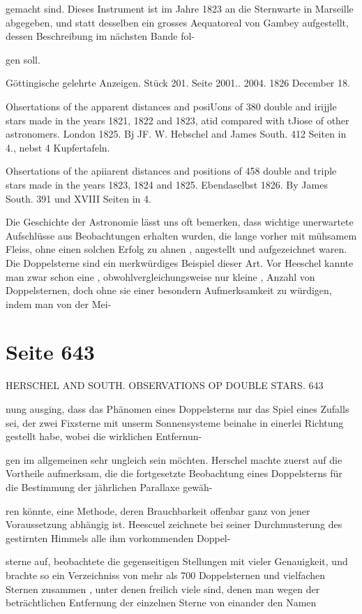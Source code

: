 \documentclass[10pt,a4paper]{article}
\begin{document}
gemacht sind. Dieses Instrument ist im Jahre 1823 an die Sternwarte in Marseille abgegeben, und statt desselben ein grosses Aequatoreal von Gambey aufgestellt, dessen Beschreibung im nächsten Bande fol-

gen soll.

Göttingische gelehrte Anzeigen. Stück 201. Seite 2001.. 2004. 1826 December 18.

Ohsertations of the apparent distances and posiUons of 380 double and irijjle stars made in the years 1821, 1822 and 1823, atid compared with tJiose of other astronomers. London 1825. Bj JF. W. Hebschel and James South. 412 Seiten in 4., nebst 4 Kupfertafeln.

Ohsertations of the apiiarent distances and positions of 458 double and triple stars made in the years 1823, 1824 and 1825. Ebendaselbst 1826. By James South. 391 und XVIII Seiten in 4.

Die Geschichte der Astronomie lässt uns oft bemerken, dass wichtige unerwartete Aufschlüsse aus Beobachtungen erhalten wurden, die lange vorher mit mühsamem Fleiss, ohne einen solchen Erfolg zu ahnen , angestellt und aufgezeichnet waren. Die Doppelsterne sind ein merkwürdiges Beispiel dieser Art. Vor Heeschel kannte man zwar schon eine , obwohlvergleichungsweise nur kleine , Anzahl von Doppelsternen, doch ohne sie einer besondern Aufmerksamkeit zu würdigen, indem man von der Mei-


\newpage
\section*{Seite 643}
HERSCHEL AND SOUTH. OBSERVATIONS OP DOUBLE STARS. 643

nung ausging, dass das Phänomen eines Doppelsterns nur das Spiel eines Zufalls sei, der zwei Fixsterne mit unserm Sonnensysteme beinahe in einerlei Richtung gestellt habe, wobei die wirklichen Entfernun-

gen im allgemeinen sehr ungleich sein möchten. Herschel machte zuerst auf die Vortheile aufmerksam, die die fortgesetzte Beobachtung eines Doppelsterns für die Bestimmung der jährlichen Parallaxe gewäh-

ren könnte, eine Methode, deren Brauchbarkeit offenbar ganz von jener Voraussetzung abhängig ist. Heescuel zeichnete bei seiner Durchmusterung des gestirnten Himmels alle ihm vorkommenden Doppel-

sterne auf, beobachtete die gegenseitigen Stellungen mit vieler Genauigkeit, und brachte so ein Verzeichniss von mehr als 700 Doppelsternen und vielfachen Sternen zusammen , unter denen freilich viele sind, denen man wegen der beträchtlichen Entfernung der einzelnen Sterne von einander den Namen
\end{document}
